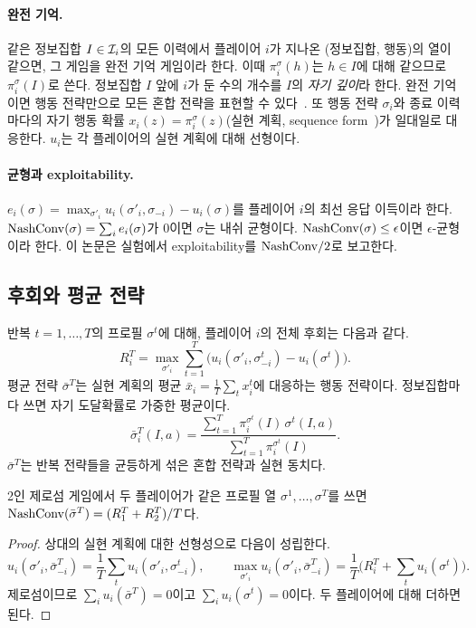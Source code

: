 \paragraph{완전 기억.}
같은 정보집합 $I\in\mathcal{I}_i$의 모든 이력에서 플레이어 $i$가 지나온 (정보집합, 행동)의 열이 같으면, 그 게임을 완전 기억 게임이라 한다.
이때 $\pi_i^\sigma(h)$는 $h\in I$에 대해 같으므로 $\pi_i^\sigma(I)$로 쓴다. 정보집합 $I$ 앞에 $i$가 둔 수의 개수를 $I$의 \emph{자기 깊이}라 한다.
완전 기억이면 행동 전략만으로 모든 혼합 전략을 표현할 수 있다~\citep{kuhn1953extensive}.
또 행동 전략 $\sigma_i$와 종료 이력마다의 자기 행동 확률 $x_i(z)=\pi_i^\sigma(z)$(실현 계획, sequence form~\citep{vonstengel1996efficient})가 일대일로 대응한다. $u_i$는 각 플레이어의 실현 계획에 대해 선형이다.

\paragraph{균형과 exploitability.}
$e_i(\sigma)=\max_{\sigma'_i}u_i(\sigma'_i,\sigma_{-i})-u_i(\sigma)$를 플레이어 $i$의 최선 응답 이득이라 한다.
$\mathrm{NashConv}(\sigma)=\sum_ie_i(\sigma)$가 0이면 $\sigma$는 내쉬 균형이다. $\mathrm{NashConv}(\sigma)\le\epsilon$이면 $\epsilon$-균형이라 한다.
이 논문은 실험에서 exploitability를 $\mathrm{NashConv}/2$로 보고한다.

\subsection{후회와 평균 전략}\label{sec:bg-regret}
반복 $t=1,\dots,T$의 프로필 $\sigma^t$에 대해, 플레이어 $i$의 전체 후회는 다음과 같다.
\[
R_i^T=\max_{\sigma'_i}\sum_{t=1}^T\Big(u_i(\sigma'_i,\sigma^t_{-i})-u_i(\sigma^t)\Big).
\]
평균 전략 $\bar\sigma^T$는 실현 계획의 평균 $\bar x_i=\frac1T\sum_tx_i^t$에 대응하는 행동 전략이다. 정보집합마다 쓰면 자기 도달확률로 가중한 평균이다.
\begin{equation}\label{eq:avg}
\bar\sigma_i^T(I,a)=\frac{\sum_{t=1}^T\pi_i^{\sigma^t}(I)\,\sigma^t(I,a)}{\sum_{t=1}^T\pi_i^{\sigma^t}(I)}.
\end{equation}
$\bar\sigma^T$는 반복 전략들을 균등하게 섞은 혼합 전략과 실현 동치다.

\begin{theorem}\label{thm:folk}
2인 제로섬 게임에서 두 플레이어가 같은 프로필 열 $\sigma^1,\dots,\sigma^T$를 쓰면 $\mathrm{NashConv}(\bar\sigma^T)=(R_1^T+R_2^T)/T$다.
\end{theorem}
\begin{proof}
상대의 실현 계획에 대한 선형성으로 다음이 성립한다.
\[
u_i(\sigma'_i,\bar\sigma^T_{-i})=\frac1T\sum_tu_i(\sigma'_i,\sigma^t_{-i}),\qquad
\max_{\sigma'_i}u_i(\sigma'_i,\bar\sigma_{-i}^T)=\frac1T\Big(R_i^T+\sum_tu_i(\sigma^t)\Big).
\]
제로섬이므로 $\sum_iu_i(\bar\sigma^T)=0$이고 $\sum_iu_i(\sigma^t)=0$이다. 두 플레이어에 대해 더하면 된다.
\end{proof}

